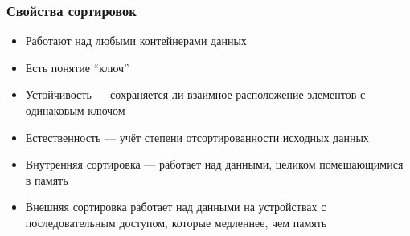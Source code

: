 \documentclass{../../slides-style}
\begin{document}

    
    \begin{frame}
        \frametitle{Свойства сортировок}
        \begin{itemize}
            \item Работают над любыми контейнерами данных
            \item Есть понятие \enquote{ключ}
            \item Устойчивость --- сохраняется ли взаимное расположение элементов с одинаковым ключом
            \item Естественность --- учёт степени отсортированности исходных данных
            \item Внутренняя сортировка --- работает над данными, целиком помещающимися в память
            \item Внешняя сортировка работает над данными на устройствах с последовательным доступом, которые медленнее, чем память
        \end{itemize}
    \end{frame}
\end{document}
